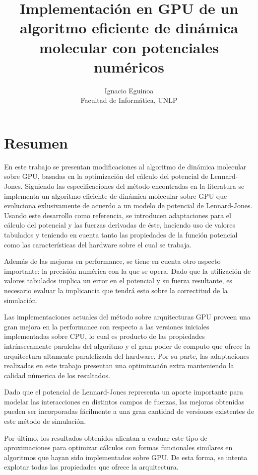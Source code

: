 \documentclass[a4paper,10pt]{report}
\title{Implementación en GPU de un algoritmo eficiente de dinámica molecular con potenciales numéricos}
\author{Ignacio Eguinoa \\ 
\small Facultad de Informática, UNLP
\date{}
}
\begin{document}
\maketitle



\section*{Resumen} 




En este trabajo se presentan modificaciones al algoritmo de dinámica molecular sobre GPU, basadas en la optimización del cálculo del potencial de Lennard-Jones.
Siguiendo las especificaciones del método encontradas en la literatura se implementa un algoritmo eficiente de dinámica molecular sobre GPU que evoluciona exlusivamente de acuerdo a un modelo de potencial de Lennard-Jones. 
Usando este desarrollo como referencia, se introducen adaptaciones para el cálculo del potencial y las fuerzas derivadas de éste, haciendo uso de valores tabulados y teniendo en cuenta tanto las propiedades de la función potencial como las características del hardware sobre el cual se trabaja.

Además de las mejoras en performance, se tiene en cuenta otro aspecto importante: la precisión numérica con la que se opera. Dado que la utilización de valores tabulados implica un error en el potencial y su fuerza resultante, es necesario evaluar la implicancia que tendrá esto sobre la correctitud de la simulación.

Las implementaciones actuales del método sobre arquitecturas GPU proveen una gran mejora en la performance con respecto a las versiones iniciales implementadas sobre CPU, lo cual es producto de las propiedades intrínsecamente paralelas del algoritmo y el gran poder de computo que ofrece la arquitectura altamente paralelizada del hardware. 
Por su parte, las adaptaciones realizadas en este trabajo presentan una optimización extra manteniendo la calidad númerica de los resultados. 

Dado que el potencial de Lennard-Jones representa un aporte importante para modelar las interacciones en distintos campos de fuerzas, las mejoras obtenidas pueden ser incorporadas fácilmente a una gran cantidad de versiones existentes de este método de simulación. 

Por último, los resultados obtenidos alientan a evaluar este tipo de aproximaciones para optimizar cálculos con formas funcionales similares en algoritmos que hayan sido implementados sobre GPU. De esta forma, se intenta explotar todas las propiedades que ofrece la arquitectura.
\end{document}
